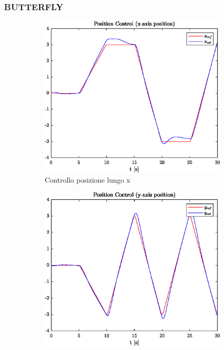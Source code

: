 \clearpage

\subsubsection{BUTTERFLY}
\begin{figure}
	\centering
	\begin{subfigure}{0.45\textwidth}
		\centering
		\includegraphics[width=1\textwidth]{Simulazioni/Figure/PID/BUTTERFLY/PositionControlXPos}
		\caption{Controllo posizione lungo x}
	\end{subfigure}
	\hfill
	\begin{subfigure}{0.45\textwidth}
		\centering
		\includegraphics[width=1\textwidth]{Simulazioni/Figure/PID/BUTTERFLY/PositionControlYPos}

\end{subfigure}
\end{figure}
